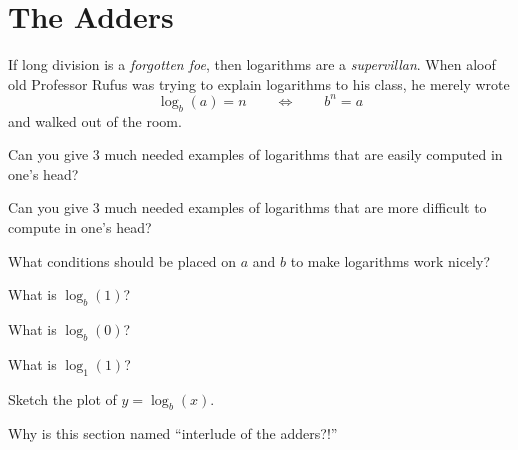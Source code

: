 \section{The Adders}



If long division is a \textit{forgotten foe},
then logarithms are a
\textit{supervillan}. When aloof old Professor
Rufus was trying to explain logarithms to his class, he merely wrote
\[
\log_b(a) = n \qquad\Leftrightarrow\qquad b^n = a
\]
and walked out of the room.

\begin{question}
Can you give $3$ much needed examples of logarithms that are easily
computed in one's head?
\end{question}
\QM

\begin{question}
Can you give $3$ much needed examples of logarithms that are more
difficult to compute in one's head?
\end{question}
\QM

\begin{question} 
What conditions should be placed on $a$ and $b$ to make logarithms
work nicely?
\end{question}
\QM

\begin{question} What is $\log_b(1)$?
\end{question}
\QM

\begin{question} What is $\log_b(0)$?
\end{question}
\QM


\begin{question} What is $\log_1(1)$?
\end{question}
\QM

\begin{question} Sketch the plot of $y = \log_b(x)$. 
\end{question}
\QM


\begin{question} Why is this section named ``interlude of the adders?!''
\end{question}
\QM




